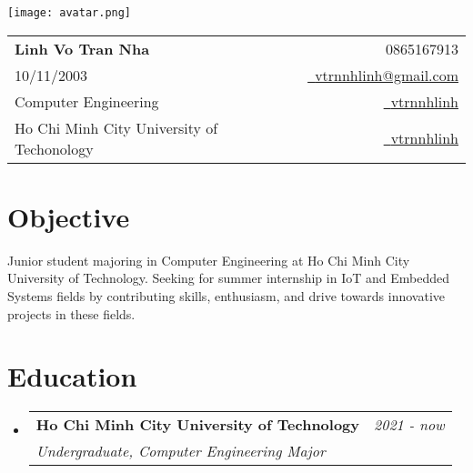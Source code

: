 \documentclass[a4paper,11pt]{article}
\makeatletter
\newcommand{\resumeSubheading}[4]{
\vspace{0.5mm}\item
    \begin{tabular*}{0.98\textwidth}[t]{l@{\extracolsep{\fill}}r}
        \textbf{#1} & \textit{\footnotesize{#4}} \\
        \textit{\footnotesize{#3}} &  \footnotesize{#2}\\
    \end{tabular*}
    \vspace{-2.4mm}
}
\newcommand{\resumeSubHeadingListStart}{\begin{itemize}[leftmargin=*,labelsep=0mm]}
\newcommand{\resumeSubHeadingListEnd}{\end{itemize}\vspace{2mm}}
\newcommand{\name}{Linh Vo Tran Nha} %
\newcommand{\phone}{0865167913} %
\newcommand{\emailb}{vtrnnhlinh@gmail.com} %
\newcommand{\dob}{10/11/2003} %
\makeatother
\begin{document}
\selectfont


\parbox{2.35cm}{%
  \texttt{[image: avatar.png]}
}
\parbox{\dimexpr\linewidth-2.8cm\relax}{
  \begin{tabularx}{\linewidth}{L r}                                                                                                                                                   \\
    \textbf{\Large \name}                        & {\raisebox{0.0\height}{\footnotesize \faPhone}\ \phone}                                                              \\
    \dob                                         & \href{mailto:\emailb}{\raisebox{0.0\height}{\footnotesize \faEnvelope}\ {\emailb}}                                   \\
    {Computer Engineering}                       & \href{https://github.com/vtrnnhlinh}{\raisebox{0.0\height}{\footnotesize \faGithub}\ {vtrnnhlinh}}               \\
    {Ho Chi Minh City University of Techonology} & \href{https://www.linkedin.com/in/vtrnnhlinh/}{\raisebox{0.0\height}{\footnotesize \faLinkedin}\ {vtrnnhlinh}}
  \end{tabularx}
}

\section{\textbf{Objective}}
\begin{itemize}[leftmargin=0.05in, label={}]
  \small{\item{
                {Junior student majoring in Computer Engineering at Ho Chi Minh City University of Technology. Seeking for summer internship in IoT and Embedded Systems fields by contributing skills, enthusiasm, and drive towards innovative projects in these fields.} \\
          }}
\end{itemize}


\section{\textbf{Education}}
\resumeSubHeadingListStart
\resumeSubheading
{Ho Chi Minh City University of Technology}{}
{Undergraduate, Computer Engineering Major}{2021 - now}
\resumeSubHeadingListEnd
\vspace{-5.5mm}
%
\end{document}
